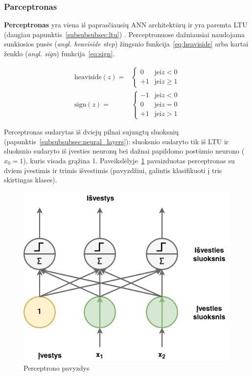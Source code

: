 \documentclass{VUMIFPSbakalaurinis}
\begin{document}
\subsubsection{Parceptronas}\label{subsubsec:perceptron}
{
	\textbf{Perceptronas} yra viena iš paprasčiausių ANN architektūrų ir yra paremta LTU (daugiau papunktis~\ref{subsubsubsec:ltu}) \cite{rosenblatt1957perceptron}. Perceptronuose dažniausiai naudojama sunkiosios pusės (\textit{angl. heaviside step}) žingsnio funkcija~\ref{eq:heaviside} arba kartai ženklo (\textit{angl. sign}) funkcija~\ref{eq:sign}.
	
	\begin{align}
		\label{eq:heaviside}
		\textrm{heaviside} (z) = &
		\begin{cases} 
			0 & \textrm{jei} z < 0 \\ 
			+1 & \textrm{jei} z \geq 1 
		\end{cases} \\
		\label{eq:sign}
		\textrm{sign} (z) = &
		\begin{cases} 
			-1 & \textrm{jei} z < 0 \\ 
			0 & \textrm{jei} z = 0 \\ 
			+1 & \textrm{jei} z > 1 
		\end{cases}
	\end{align}
	
	Perceptronas sudarytas iš dviejų pilnai sujungtų sluoksnių (papunktis~\ref{subsubsubsec:neural_layers}): sluoksnio sudaryto tik iš LTU ir sluoksnio sudaryto iš įvesties neuronų bei dažnai papildomo postūmio neurono (\(x_0 = 1\)), kuris visada grąžina 1. Paveikslėlyje~\ref{img:perceptron} pavaizduotas perceptronas su dviem įvestimis ir trimis išvestimis (pavyzdžiui, galintis klasifikuoti į tris skirtingas klases).
	
	
	\begin{figure}[H]
		\centering
		\includegraphics[scale=0.33]{img/perceptron}
		\caption{Perceptrono pavyzdys}
		\label{img:perceptron}
	\end{figure} 
	
}
\end{document}
